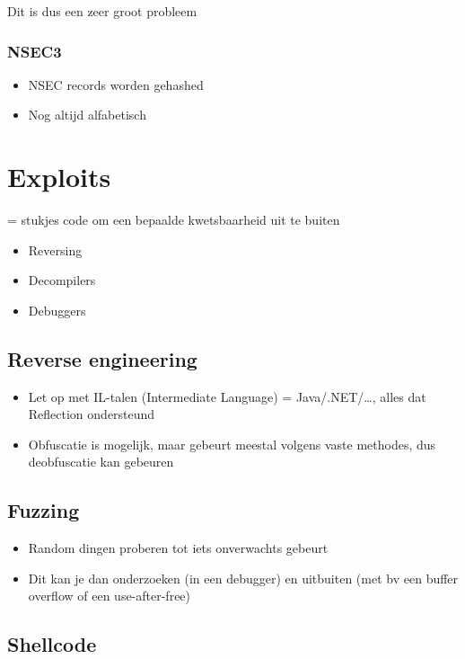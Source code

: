 \documentclass{article}
\begin{document}
Dit is dus een zeer groot probleem

\subsubsection{NSEC3}

\begin{itemize}
    \item NSEC records worden gehashed
    \item Nog altijd alfabetisch
\end{itemize}

\section{Exploits}

= stukjes code om een bepaalde kwetsbaarheid uit te buiten

\begin{itemize}
    \item Reversing 
    \item Decompilers
    \item Debuggers
\end{itemize}

\subsection{Reverse engineering}

\begin{itemize}
    \item Let op met IL-talen (Intermediate Language) = Java/.NET/\dots, alles dat Reflection ondersteund
    \item Obfuscatie is mogelijk, maar gebeurt meestal volgens vaste methodes, dus deobfuscatie kan gebeuren 
\end{itemize}

\subsection{Fuzzing}

\begin{itemize}
    \item Random dingen proberen tot iets onverwachts gebeurt
    \item Dit kan je dan onderzoeken (in een debugger) en uitbuiten (met bv een buffer overflow of een use-after-free)
\end{itemize}

\subsection{Shellcode}
\end{document}
